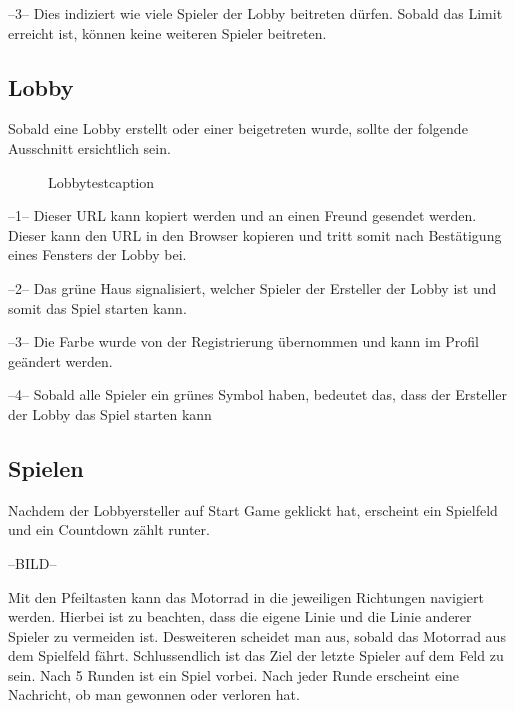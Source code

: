 \documentclass[11pt,ngerman]{article}
\begin{document}
    --3-- Dies indiziert wie viele Spieler der Lobby beitreten dürfen. Sobald das Limit erreicht ist, können keine weiteren Spieler beitreten.
    
	\subsection{Lobby}
	
	Sobald eine Lobby erstellt oder einer beigetreten wurde, sollte der folgende Ausschnitt ersichtlich sein.
    \begin{figure}[H]
    	\centering
    	\caption{Lobbytestcaption}
    	\label{fig:Lobbytest_caption}
    \end{figure}
  
    
    --1-- Dieser URL kann kopiert werden und an einen Freund gesendet werden. Dieser kann den URL in den Browser kopieren und tritt somit nach Bestätigung eines Fensters der Lobby bei.
    
    --2-- Das grüne Haus signalisiert, welcher Spieler der Ersteller der Lobby ist und somit das Spiel starten kann.
    
    --3-- Die Farbe wurde von der Registrierung übernommen und kann im Profil geändert werden.
    
    --4-- Sobald alle Spieler ein grünes Symbol haben, bedeutet das, dass der Ersteller der Lobby das Spiel starten kann
    
    \subsection{Spielen}
    
    Nachdem der Lobbyersteller auf Start Game geklickt hat, erscheint ein Spielfeld und ein Countdown zählt runter.
    
    --BILD--
    
    Mit den Pfeiltasten kann das Motorrad in die jeweiligen Richtungen navigiert werden. 
    Hierbei ist zu beachten, dass die eigene Linie und die Linie anderer Spieler zu vermeiden ist. Desweiteren scheidet man aus, sobald das Motorrad aus dem Spielfeld fährt. 
    Schlussendlich ist das Ziel der letzte Spieler auf dem Feld zu sein. Nach 5 Runden ist ein Spiel vorbei. Nach jeder Runde erscheint eine Nachricht, ob man gewonnen oder verloren hat.
   
    
\end{document}
